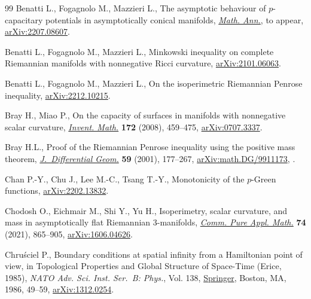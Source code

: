 \begin{thebibliography}{99}
Benatti L., Fogagnolo M., Mazzieri L., The asymptotic behaviour of
 {$p$}-capacitary potentials in asymptotically conical manifolds,
 \href{https://doi.org/10.1007/s00208-022-02515-4}{\textit{Math. Ann.}}, {t}o appear, \href{https://arxiv.org/abs/2207.08607}{arXiv:2207.08607}.

Benatti L., Fogagnolo M., Mazzieri L., Minkowski inequality on complete
 {R}iemannian manifolds with nonnegative {R}icci curvature,
 \href{https://arxiv.org/abs/2101.06063}{arXiv:2101.06063}.

Benatti L., Fogagnolo M., Mazzieri L., On the isoperimetric {R}iemannian
 {P}enrose inequality, \href{https://arxiv.org/abs/2212.10215}{arXiv:2212.10215}.

Bray H., Miao P., On the capacity of surfaces in manifolds with nonnegative
 scalar curvature, \href{https://doi.org/10.1007/s00222-007-0102-x}{\textit{Invent. Math.}} \textbf{172} (2008), 459--475,
 \href{https://arxiv.org/abs/0707.3337}{arXiv:0707.3337}.

Bray H.L., Proof of the {R}iemannian {P}enrose inequality using the positive
 mass theorem, \href{https://doi.org/10.4310/jdg/1090349428}{\textit{J.~Differential Geom.}} \textbf{59} (2001), 177--267,
 \href{https://arxiv.org/abs/math.DG/9911173}{arXiv:math.DG/9911173},
.

Chan P.-Y., Chu J., Lee M.-C., Tsang T.-Y., Monotonicity of the $p$-{G}reen
 functions, \href{https://arxiv.org/abs/2202.13832}{arXiv:2202.13832}.

Chodosh O., Eichmair M., Shi Y., Yu H., Isoperimetry, scalar curvature, and
 mass in asymptotically flat {R}iemannian 3-manifolds, \href{https://doi.org/10.1002/cpa.21981}{\textit{Comm. Pure
 Appl. Math.}} \textbf{74} (2021), 865--905, \href{https://arxiv.org/abs/1606.04626}{arXiv:1606.04626}.

Chru\'sciel P., Boundary conditions at spatial infinity from a {H}amiltonian
 point of view, in Topological {P}roperties and {G}lobal {S}tructure of
 {S}pace-{T}ime ({E}rice, 1985), \textit{NATO Adv. Sci. Inst. Ser.~B: Phys.},
 Vol. 138, \href{https://doi.org/10.1007/978-1-4899-3626-4_5}{Springer}, Boston, MA, 1986, 49--59, \href{https://arxiv.org/abs/1312.0254}{arXiv:1312.0254}.


\end{thebibliography}
